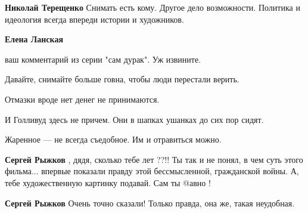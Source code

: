 \begin{itemize}
\begin{itemize}
 
\textbf{Николай Терещенко} Снимать есть кому. Другое дело возможности. Политика и идеология всегда впереди истории и художников.

 
\textbf{Елена Ланская} 

ваш комментарий из серии "сам дурак". Уж извините.

Давайте, снимайте больше говна, чтобы люди перестали верить.

Отмазки вроде нет денег не принимаются.

И Голливуд здесь не причем. Они в шапках ушанках до сих пор сидят.

Жаренное — не всегда съедобное. Им и отравиться можно.

 
\textbf{Сергей Рыжков} , дядя, сколько тебе лет ??!! Ты так и не понял, в чем суть этого фильма... впервые показали правду этой бессмысленной, гражданской войны. А, тебе художественную картинку подавай. Сам ты @авно !

 
\textbf{Сергей Рыжков}
Очень точно сказали!
Только правда, она же, такая неудобная.

 

\end{itemize}
\end{itemize}
